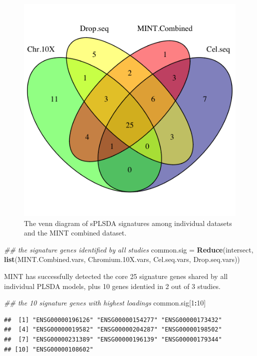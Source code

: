 \documentclass[]{book}
\newenvironment{Shaded}{\begin{snugshade}}{\end{snugshade}}
\newcommand{\CommentTok}[1]{\textcolor[rgb]{0.56,0.35,0.01}{\textit{#1}}}
\newcommand{\DecValTok}[1]{\textcolor[rgb]{0.00,0.00,0.81}{#1}}
\newcommand{\FloatTok}[1]{\textcolor[rgb]{0.00,0.00,0.81}{#1}}
\newcommand{\KeywordTok}[1]{\textcolor[rgb]{0.13,0.29,0.53}{\textbf{#1}}}
\newcommand{\NormalTok}[1]{#1}
\newcommand{\OperatorTok}[1]{\textcolor[rgb]{0.81,0.36,0.00}{\textbf{#1}}}
\newcommand{\StringTok}[1]{\textcolor[rgb]{0.31,0.60,0.02}{#1}}
\theoremstyle{definition}
\theoremstyle{definition}
\theoremstyle{definition}
\theoremstyle{remark}
\begin{document}
\begin{figure}[ht]

{\centering \includegraphics[width=0.7\linewidth]{figures/vennMINT} 

}

\caption{ The venn diagram of sPLSDA signatures among individual datasets and the MINT combined dataset.}\label{fig:unnamed-chunk-28}
\end{figure}

\begin{Shaded}
\begin{Highlighting}[]
\CommentTok{## the signature genes identified by all studies}
\NormalTok{common.sig =}\StringTok{ }\KeywordTok{Reduce}\NormalTok{(intersect, }\KeywordTok{list}\NormalTok{(MINT.Combined.vars, Chromium}\FloatTok{.10}\NormalTok{X.vars, Cel.seq.vars, Drop.seq.vars))}
\end{Highlighting}
\end{Shaded}

MINT has successfully detected the core 25 signature genes shared by all
individual PLSDA models, plus 10 genes identied in 2 out of 3 studies.

\begin{Shaded}
\begin{Highlighting}[]
\CommentTok{## the 10 signature genes with highest loadings}
\NormalTok{common.sig[}\DecValTok{1}\OperatorTok{:}\DecValTok{10}\NormalTok{]}
\end{Highlighting}
\end{Shaded}

\begin{verbatim}
##  [1] "ENSG00000196126" "ENSG00000154277" "ENSG00000173432"
##  [4] "ENSG00000019582" "ENSG00000204287" "ENSG00000198502"
##  [7] "ENSG00000231389" "ENSG00000196139" "ENSG00000179344"
## [10] "ENSG00000108602"
\end{verbatim}
\end{document}
